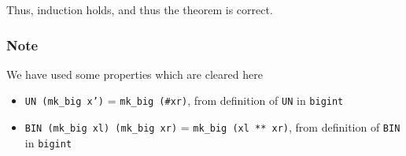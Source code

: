 \documentclass{article}
\begin{document}
{\large Thus, induction holds, and thus the theorem is correct.}

\subsubsection*{Note}
We have used some properties which are cleared here
\begin{itemize}
    \item \texttt{UN (mk\_big x')} = \texttt{mk\_big (\#xr)}, from definition of \texttt{UN} in \texttt{bigint}
    \item \texttt{BIN (mk\_big xl) (mk\_big xr)} = \texttt{mk\_big (xl ** xr)},  from definition of \texttt{BIN} in \texttt{bigint}
\end{itemize}



\end{document}
